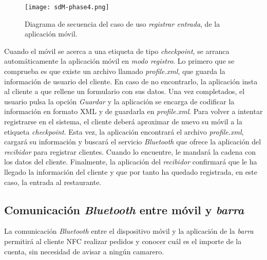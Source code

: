   \begin{sidewaysfigure}[h]
    \begin{center}
      \texttt{[image: sdM-phase4.png]}
      \caption{Diagrama de secuencia del caso de uso \emph{registrar entrada},
      de la aplicación móvil.}
      \label{fig:sdM-phase4}
    \end{center}
  \end{sidewaysfigure}

Cuando el móvil se acerca a una etiqueta de tipo \emph{checkpoint}, se
arranca automáticamente la aplicación móvil en \emph{modo registro}. Lo
primero que se comprueba es que existe un archivo llamado \emph{profile.xml},
que guarda la información de usuario del cliente. En caso de no encontrarlo,
la aplicación insta al cliente a que rellene un formulario con sus datos.
Una vez completados, el usuario pulsa la opción \emph{Guardar} y la
aplicación se encarga de codificar la información en formato \acs{XML} y de
guardarla en \emph{profile.xml}. Para volver a intentar registrarse en el
sistema, el cliente deberá aproximar de nuevo su móvil a la etiqueta
\emph{checkpoint}. Esta vez, la aplicación encontrará el archivo
\emph{profile.xml}, cargará su información y buscará el servicio
\emph{Bluetooth} que ofrece la aplicación del \emph{recibidor} para
registrar clientes. Cuando lo encuentre, le mandará la cadena con los datos
del cliente. Finalmente, la aplicación del \emph{recibidor} confirmará que
le ha llegado la información del cliente y que por tanto ha quedado
registrada, en este caso, la entrada al restaurante.


\subsection{Comunicación \emph{Bluetooth} entre móvil y \emph{barra}}
\label{subsec:mobile-bar}
La comunicación \emph{Bluetooth} entre el dispositivo móvil y la aplicación
de la \emph{barra} permitirá al cliente \acs{NFC} realizar pedidos y conocer
cuál es el importe de la cuenta, sin necesidad de avisar a ningún camarero.

